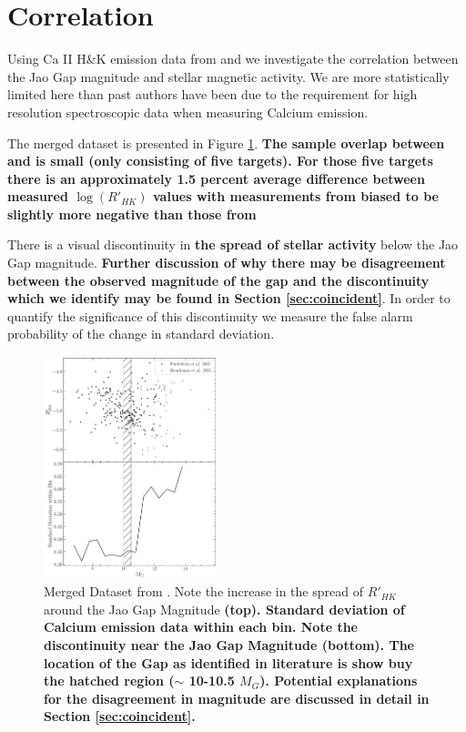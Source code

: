 \section{Correlation}\label{sec:results}
Using Ca II H\&K emission data from \citet{Perdelwitz2021} and
\citet{Boudreaux2022} \citep[quantified using the $R'_{HK}$
metric][]{Middelkoop1982, Rutten1984} we investigate the correlation between
the Jao Gap magnitude and stellar magnetic activity. We are more statistically
limited here than past authors have been due to the requirement for high
resolution spectroscopic data when measuring Calcium emission.

The merged dataset is presented in Figure \ref{fig:initData}. \textbf{The
sample overlap between \citet{Perdelwitz2021} and \citet{Boudreaux2022} is
small (only consisting of five targets). For those five targets there is an
approximately 1.5 percent average difference between measured $\log(R'_{HK})$
values with measurements from \citeauthor{Boudreaux2022} biased to be slightly
more negative than those from \citeauthor{Perdelwitz2021}}

There is a visual discontinuity in \textbf{the spread of stellar activity}
below the Jao Gap magnitude. \textbf{Further discussion of why there may be
disagreement between the observed magnitude of the gap and the discontinuity
which we identify may be found in Section \ref{sec:coincident}}. In order to
quantify the significance of this discontinuity we measure the false alarm
probability of the change in standard deviation.

\begin{figure}
  \centering
  \includegraphics[width=0.45\textwidth]{figures/CombinedDeviation.pdf}
  \caption{Merged Dataset from \citet{Perdelwitz2021, Boudreaux2022}. Note the
  increase in the spread of $R'_{HK}$ around the Jao Gap Magnitude \textbf{(top).
  Standard deviation of Calcium emission data within each bin. Note the
  discontinuity near the Jao Gap Magnitude (bottom). The location of the Gap
  as identified in literature is show buy the hatched region ($\sim$ 10-10.5 $M_{G}$). Potential
  explanations for the disagreement in magnitude are discussed in detail
  in Section \ref{sec:coincident}.}}
  \label{fig:initData}
\end{figure}

